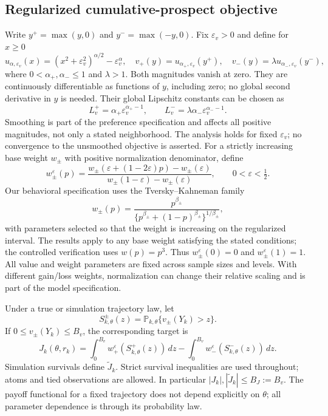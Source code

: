 \documentclass[11pt]{article}
\newcommand{\Pp}{\mathbb P}
\newcommand{\1}{\mathbf 1}
\newcommand{\eps}{\varepsilon}
\begin{document}
\subsection{Regularized cumulative-prospect objective}
Write $y^+=\max(y,0)$ and $y^-=\max(-y,0)$. Fix $\eps_v>0$ and define for $x\ge0$
\begin{equation}\label{eq:value-functions}
 u_{\alpha,\eps_v}(x)=(x^2+\eps_v^2)^{\alpha/2}-\eps_v^\alpha,
 \quad v_+(y)=u_{\alpha_+,\eps_v}(y^+),\quad
 v_-(y)=\lambda u_{\alpha_-,\eps_v}(y^-),
\end{equation}
where $0<\alpha_+,\alpha_-\le1$ and $\lambda>1$. Both magnitudes vanish at zero. They are continuously differentiable as functions of $y$, including zero; no global second derivative in $y$ is needed. Their global Lipschitz constants can be chosen as
\begin{equation}\label{eq:value-lipschitz}
 L_v^+=\alpha_+\eps_v^{\alpha_+-1},\qquad
 L_v^-=\lambda\alpha_-\eps_v^{\alpha_--1}.
\end{equation}
Smoothing is part of the preference specification and affects all positive magnitudes, not only a stated neighborhood. The analysis holds for fixed $\eps_v$; no convergence to the unsmoothed objective is asserted.
For a strictly increasing base weight $w_\pm$ with positive normalization denominator, define
\begin{equation}\label{eq:prob-weights}
 w_\pm^\eps(p)=
 \frac{w_\pm(\eps+(1-2\eps)p)-w_\pm(\eps)}
 {w_\pm(1-\eps)-w_\pm(\eps)},\qquad 0<\eps<\tfrac12.
\end{equation}
Our behavioral specification uses the Tversky--Kahneman family
\[
 w_\pm(p)=\frac{p^{\beta_\pm}}
 {\{p^{\beta_\pm}+(1-p)^{\beta_\pm}\}^{1/\beta_\pm}},
\]
with parameters selected so that the weight is increasing on the regularized interval. The results apply to any base weight satisfying the stated conditions; the controlled verification uses $w(p)=p^3$. Thus $w_\pm^\eps(0)=0$ and $w_\pm^\eps(1)=1$. All value and weight parameters are fixed across sample sizes and levels. With different gain/loss weights, normalization can change their relative scaling and is part of the model specification.

Under a true or simulation trajectory law, let
\[
 S_{k,\theta}^{\pm}(z)=\Pp_{k,\theta}\{v_\pm(Y_k)>z\}.
\]
If $0\le v_\pm(Y_k)\le B_v$, the corresponding target is
\begin{equation}\label{eq:cpt-objective}
 J_k(\theta,r_{k})=\int_0^{B_v}w_+^\eps(S_{k,\theta}^+(z))\,dz
 -\int_0^{B_v}w_-^\eps(S_{k,\theta}^-(z))\,dz.
\end{equation}
Simulation survivals define $\widetilde J_k$. Strict survival inequalities are used throughout; atoms and tied observations are allowed. In particular $|J_k|,|\widetilde J_k|\le B_J:=B_v$. The payoff functional for a fixed trajectory does not depend explicitly on $\theta$; all parameter dependence is through its probability law.
\end{document}
